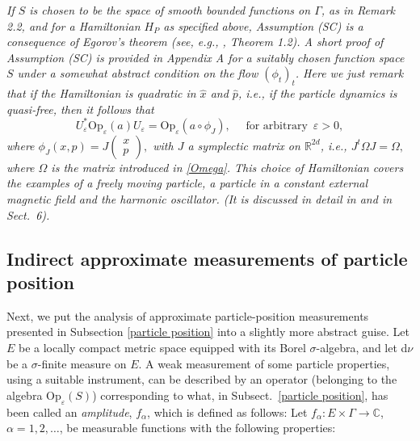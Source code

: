 \documentclass[12pt]{article}
\begin{document}
 \textit{If $S$ is chosen to be the space of smooth bounded functions on $\Gamma$, as in 
Remark 2.2, and for a Hamiltonian $H_P$ as specified above, Assumption (SC) is a consequence of Egorov's theorem
(see, e.g., \cite{BR}, Theorem 1.2). A short proof of Assumption (SC) is provided in Appendix A for a suitably chosen 
function space $S$ under a somewhat abstract condition on the flow $(\phi_t)_t$. Here we just remark that if the Hamiltonian is quadratic in $\hat{x}$ and $\hat{p}$, i.e., 
if the particle dynamics is quasi-free, then it follows that}
\begin{equation}\label{symp matrix}
U_{\varepsilon}^{*} \text{Op}_{\varepsilon}(a) U_{\varepsilon} = \text{Op}_{\varepsilon}(a\circ \phi_J), \quad \text{ for arbitrary }\,\varepsilon>0,
\end{equation}
\textit{where $\phi_{J}(x,p) = J\begin{pmatrix} x \\ p \end{pmatrix},$ with $J$ a symplectic matrix on $\mathbb{R}^{2d}$, i.e.,
$J^{t} \Omega J = \Omega,$ where $\Omega$ is the matrix introduced in \eqref{Omega}.
This choice of Hamiltonian covers the examples of a freely moving particle, a particle in a constant external 
magnetic field and the harmonic oscillator. (It is discussed in detail in \cite{BBFF} and in Sect.~6).}

\subsection{Indirect approximate measurements of particle position}\label{measurement}
Next, we put the analysis of approximate particle-position measurements presented in Subsection 
\ref{particle position} into a slightly more abstract guise. Let $E$ be a locally compact metric space equipped with its Borel $\sigma$-algebra, and let d$\nu$ be a 
$\sigma$-finite measure on $E$. A weak measurement of some particle properties, using a suitable 
instrument, can be described by an operator (belonging to the algebra $\text{Op}_{\varepsilon}(S)$) corresponding to what, in 
Subsect.~\ref{particle position}, has been called an \textit{amplitude}, $f_{\alpha}$, which is defined as follows: Let
$f_{\alpha}: E\times \Gamma \rightarrow \mathbb{C}$, $\alpha = 1,2, \dots$, be measurable functions with the following properties: 
\end{document}
